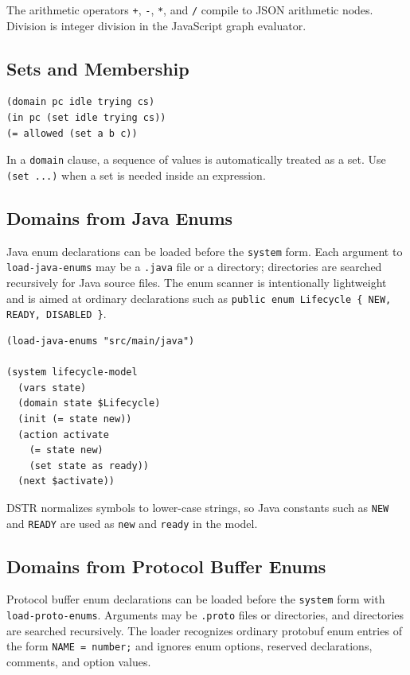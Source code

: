 \documentclass[11pt]{article}
\begin{document}
The arithmetic operators \texttt{+}, \texttt{-}, \texttt{*}, and \texttt{/}
compile to JSON arithmetic nodes.  Division is integer division in the
JavaScript graph evaluator.

\subsection{Sets and Membership}

\begin{lstlisting}[language=DSTR]
(domain pc idle trying cs)
(in pc (set idle trying cs))
(= allowed (set a b c))
\end{lstlisting}

In a \texttt{domain} clause, a sequence of values is automatically treated as a
set.  Use \texttt{(set ...)} when a set is needed inside an expression.

\subsection{Domains from Java Enums}

Java enum declarations can be loaded before the \texttt{system} form.  Each
argument to \texttt{load-java-enums} may be a \texttt{.java} file or a directory;
directories are searched recursively for Java source files.  The enum scanner is
intentionally lightweight and is aimed at ordinary declarations such as
\texttt{public enum Lifecycle \{ NEW, READY, DISABLED \}}.

\begin{lstlisting}[language=DSTR]
(load-java-enums "src/main/java")

(system lifecycle-model
  (vars state)
  (domain state $Lifecycle)
  (init (= state new))
  (action activate
    (= state new)
    (set state as ready))
  (next $activate))
\end{lstlisting}

DSTR normalizes symbols to lower-case strings, so Java constants such as
\texttt{NEW} and \texttt{READY} are used as \texttt{new} and \texttt{ready} in
the model.

\subsection{Domains from Protocol Buffer Enums}

Protocol buffer enum declarations can be loaded before the \texttt{system} form
with \texttt{load-proto-enums}.  Arguments may be \texttt{.proto} files or
directories, and directories are searched recursively.  The loader recognizes
ordinary protobuf enum entries of the form \texttt{NAME = number;} and ignores
enum options, reserved declarations, comments, and option values.
\end{document}
